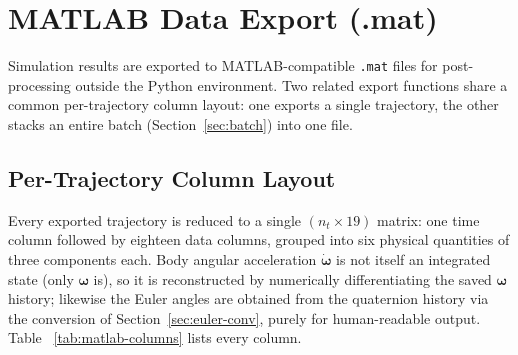 \section{MATLAB Data Export (.mat)}
\label{sec:matlab-export}

Simulation results are exported to MATLAB-compatible \texttt{.mat} files
for post-processing outside the Python environment. Two related export
functions share a common per-trajectory column layout: one exports a
single trajectory, the other stacks an entire batch (Section~\ref{sec:batch})
into one file.

\subsection{Per-Trajectory Column Layout}
\label{sec:matlab-columns}

Every exported trajectory is reduced to a single $(n_t \times 19)$
matrix: one time column followed by eighteen data columns, grouped into
six physical quantities of three components each. Body angular
acceleration $\dot{\bm{\omega}}$ is not itself an integrated state (only
$\bm{\omega}$ is), so it is reconstructed by numerically differentiating
the saved $\bm{\omega}$ history; likewise the Euler angles are obtained
from the quaternion history via the conversion of
Section~\ref{sec:euler-conv}, purely for human-readable output. Table~
\ref{tab:matlab-columns} lists every column.

